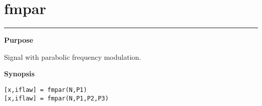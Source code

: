 


\section*{\hspace*{-1.6cm} fmpar}

\vspace*{-.4cm}
\hspace*{-1.6cm}\rule[0in]{16.5cm}{.02cm}
\vspace*{.2cm}



{\bf \large \sf Purpose}\\
\hspace*{1.5cm}
\begin{minipage}[t]{13.5cm}
Signal with parabolic frequency modulation.
\end{minipage}
\vspace*{.5cm}


{\bf \large \sf Synopsis}\\
\hspace*{1.5cm}
\begin{minipage}[t]{13.5cm}
\begin{verbatim}
[x,iflaw] = fmpar(N,P1)
[x,iflaw] = fmpar(N,P1,P2,P3)
\end{verbatim}
\end{minipage}
\vspace*{.5cm}


